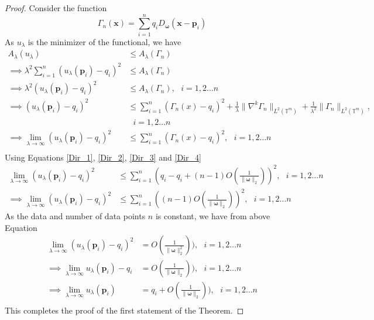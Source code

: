 \documentclass[multixcb]{amstext-l}
\theoremstyle{plain}
\theoremstyle{definition}
\theoremstyle{definition}
\theoremstyle{remark}
\numberwithin{equation}{chapter}
\begin{document}
\begin{proof}
Consider the function \begin{equation}\label{Dir_3}
    \Gamma_n(\boldsymbol{x}) = \sum\limits_{i=1}^n q_i D_{\boldsymbol{\omega}}(\boldsymbol{x}-\boldsymbol{p}_i)
\end{equation}
As $u_{\lambda}$ is the minimizer of the functional, we have \begin{equation}\label{Dir_4}\begin{aligned}
    A_{\lambda}(u_{\lambda}) &\le A_{\lambda}(\Gamma_n)\\
    \implies \lambda^2\sum_{i=1}^n(u_{\lambda}(\boldsymbol{p}_i)-q_i)^2 &\le A_{\lambda}(\Gamma_n)\\
    \implies \lambda^2(u_{\lambda}(\boldsymbol{p}_i)-q_i)^2 &\le A_{\lambda}(\Gamma_n),\mbox{     }i=1,2\ldots n\\
    \implies (u_{\lambda}(\boldsymbol{p}_i)-q_i)^2 &\le \sum_{i=1}^n(\Gamma_n(x)-q_i)^2 + \frac{1}{\lambda}\|\nabla^k\Gamma_n\|_{L^2(\mathbb{T}^m)} + \frac{1}{\lambda^2}\|\Gamma_n\|_{L^2(\mathbb{T}^m)},\\ &\mbox{     }i=1,2\ldots n\\
    \implies \lim\limits_{\lambda\to\infty}(u_{\lambda}(\boldsymbol{p}_i)-q_i)^2 &\le \sum_{i=1}^n(\Gamma_n(x)-q_i)^2,\mbox{     }i=1,2\ldots n\\
    \end{aligned}
\end{equation}
Using Equations \ref{Dir_1}, \ref{Dir_2}, \ref{Dir_3} and \ref{Dir_4}
\begin{equation}
\begin{aligned}
    \lim\limits_{\lambda\to\infty}(u_{\lambda}(\boldsymbol{p}_i)-q_i)^2 &\le \sum\limits_{i=1}^n(q_i-q_i+(n-1)O(\frac{1}{\|\boldsymbol{\omega}\|_2}))^2,\mbox{     }i=1,2\ldots n\\
    \implies \lim\limits_{\lambda\to\infty}(u_{\lambda}(\boldsymbol{p}_i)-q_i)^2 &\le \sum\limits_{i=1}^n((n-1)O(\frac{1}{\|\boldsymbol{\omega}\|_2}))^2,\mbox{     }i=1,2\ldots n
    \end{aligned}
\end{equation}
As the data and number of data points $n$ is constant, we have from above Equation
\begin{equation}
\begin{aligned}
 \lim\limits_{\lambda\to\infty}(u_{\lambda}(\boldsymbol{p}_i)-q_i)^2 &= O(\frac{1}{\|\boldsymbol{\omega}\|_2^2})),\mbox{     }i=1,2\ldots n\\
 \implies \lim\limits_{\lambda\to\infty}u_{\lambda}(\boldsymbol{p}_i)-q_i &= O(\frac{1}{\|\boldsymbol{\omega}\|_2})),\mbox{     }i=1,2\ldots n\\
 \implies \lim\limits_{\lambda\to\infty}u_{\lambda}(\boldsymbol{p}_i) &= q_i + O(\frac{1}{\|\boldsymbol{\omega}\|_2})),\mbox{     }i=1,2\ldots n\\
\end{aligned}    
\end{equation}
This completes the proof of the first statement of the Theorem.
\end{proof}
\end{document}
